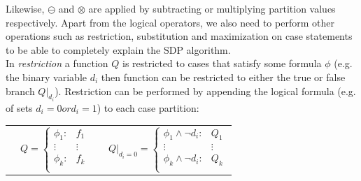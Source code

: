 \documentclass[letterpaper]{article}
\renewcommand{\-}{\text{-}}
\begin{document}
Likewise, $\ominus$ and $\otimes$ are applied by subtracting or multiplying partition values respectively.  
Apart from the logical operators, we also need to perform other operations such as restriction, substitution and maximization on case statements to be able to completely explain the SDP algorithm. \\

In \emph{restriction} a function $Q$ is restricted to cases that satisfy some formula $\phi$ (e.g. the binary variable $d_i$ then function can be restricted to either the true or false branch $Q|_{d_i}$).  
Restriction can be performed by appending  the logical formula (e.g. of \InventoryControl sets $d_i=0 or d_i=1$) to each case partition:
{\footnotesize
\begin{center}
\begin{tabular}{r c c l}
&
\hspace{-6mm} 
  $Q = \begin{cases}
    \phi_1: & f_1 \\ 
   \vdots&\vdots\\ 
    \phi_k: & f_k \\ 
  \end{cases}$
&

&
\hspace{-2mm}
  $Q|_{d_i = 0} = \begin{cases}
    \phi_1 \land \neg d_i : & Q_1 \\ 
   \vdots&\vdots \\ 
    \phi_k \land \neg d_i : & Q_k \\ 
  \end{cases}$
\end{tabular}
\end{center}
}
\end{document}
